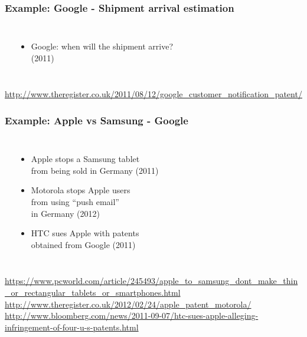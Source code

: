 \documentclass[dvipsnames]{beamer}
\theoremstyle{plain}
\begin{document}
\begin{frame}
  \frametitle{Example: Google - Shipment arrival estimation}

  \begin{columns}
    \begin{center}
    \end{center}

    \begin{itemize}
      \item Google: when will the shipment arrive?\\
        (2011)
    \end{itemize}
  \end{columns}

  \medskip
  \tiny{\url{http://www.theregister.co.uk/2011/08/12/google_customer_notification_patent/}}\\
\end{frame}

\begin{frame}
  \frametitle{Example: Apple vs Samsung - Google}

  \begin{columns}
    \begin{center}
    \end{center}

    \begin{itemize}
      \item Apple stops a Samsung tablet\\
        from being sold in Germany (2011)
      \item Motorola stops Apple users\\
        from using ``push email''\\
        in Germany (2012)
      \item HTC sues Apple with patents\\
        obtained from Google (2011)
    \end{itemize}
  \end{columns}

  \medskip
  \tiny{\url{https://www.pcworld.com/article/245493/apple_to_samsung_dont_make_thin_or_rectangular_tablets_or_smartphones.html}}\\
  \tiny{\url{http://www.theregister.co.uk/2012/02/24/apple_patent_motorola/}}\\
  \tiny{\url{http://www.bloomberg.com/news/2011-09-07/htc-sues-apple-alleging-infringement-of-four-u-s-patents.html}}\\
\end{frame}
\end{document}
